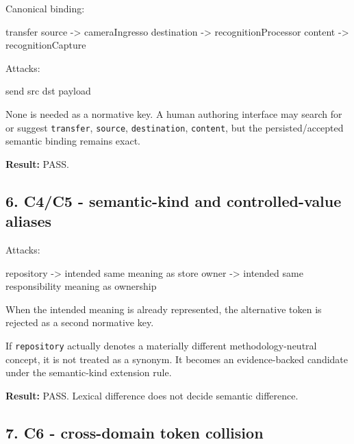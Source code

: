 \documentclass[
  10pt,
  a4paper,
]{article}
\newenvironment{Shaded}{}{}
\newcommand{\NormalTok}[1]{#1}
\begin{document}
Canonical binding:

\begin{Shaded}
\begin{Highlighting}[]
\NormalTok{transfer}
\NormalTok{  source      {-}\textgreater{} cameraIngresso}
\NormalTok{  destination {-}\textgreater{} recognitionProcessor}
\NormalTok{  content     {-}\textgreater{} recognitionCapture}
\end{Highlighting}
\end{Shaded}

Attacks:

\begin{Shaded}
\begin{Highlighting}[]
\NormalTok{send}
\NormalTok{src}
\NormalTok{dst}
\NormalTok{payload}
\end{Highlighting}
\end{Shaded}

None is needed as a normative key. A human authoring interface may
search for or suggest \texttt{transfer}, \texttt{source},
\texttt{destination}, \texttt{content}, but the persisted/accepted
semantic binding remains exact.

\textbf{Result:} PASS.

\subsection{6. C4/C5 - semantic-kind and controlled-value
aliases}\label{6-c4c5---semantic-kind-and-controlled-value-aliases}

Attacks:

\begin{Shaded}
\begin{Highlighting}[]
\NormalTok{repository  {-}\textgreater{} intended same meaning as store}
\NormalTok{owner       {-}\textgreater{} intended same responsibility meaning as ownership}
\end{Highlighting}
\end{Shaded}

When the intended meaning is already represented, the alternative token
is rejected as a second normative key.

If \texttt{repository} actually denotes a materially different
methodology-neutral concept, it is not treated as a synonym. It becomes
an evidence-backed candidate under the semantic-kind extension rule.

\textbf{Result:} PASS. Lexical difference does not decide semantic
difference.

\subsection{7. C6 - cross-domain token
collision}\label{7-c6---cross-domain-token-collision}
\end{document}
